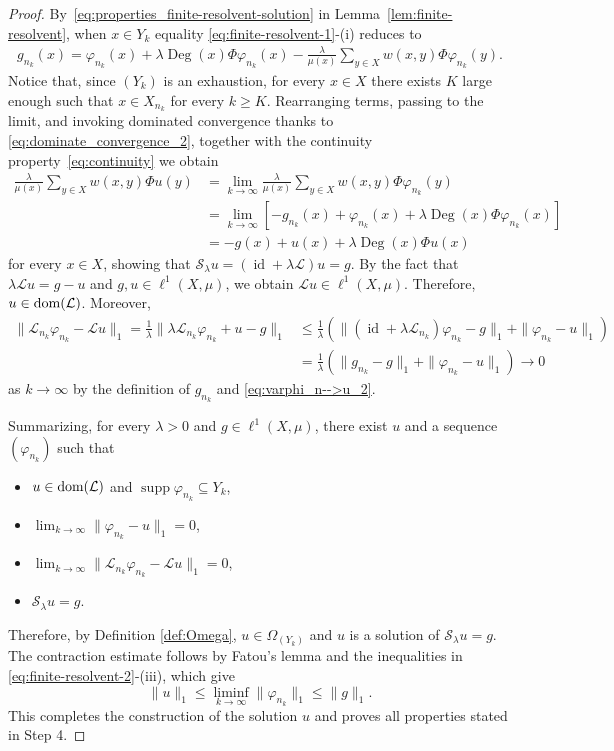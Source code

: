 \documentclass[letterpaper]{article}
\theoremstyle{definition}
\theoremstyle{named}
\numberwithin{equation}{section}
\newcommand{\dom}{\textnormal{dom}} %
\newcommand{\Deg}{\operatorname{Deg}}
\newcommand{\id}{\operatorname{id}}
\newcommand{\Deltaphi}{\mathcal{L}}
\begin{document}
\begin{proof}
By~\eqref{eq:properties_finite-resolvent-solution} in Lemma~\ref{lem:finite-resolvent}, when $x\in Y_k$
equality \eqref{eq:finite-resolvent-1}-(i) reduces to
\begin{align*}
g_{n_k}(x) = \varphi_{n_k}(x)+\lambda\Deg(x)\Phi\varphi_{n_k}(x)  -\frac{\lambda}{\mu(x)}\sum_{y\in X}w(x,y)\Phi\varphi_{n_k}(y).
\end{align*}
Notice that, since $(Y_k)$ is an exhaustion, for every $x\in X$ there exists $K$ large enough such that $x\in X_{n_k}$ for every $k\geq K$.  Rearranging terms, passing to the limit, and invoking dominated convergence thanks to \eqref{eq:dominate_convergence_2}, together with the continuity property~\eqref{eq:continuity} we obtain
\begin{align}
\frac{\lambda}{\mu(x)} \sum_{y \in X} w(x,y) \Phi u (y) & = \lim_{k\to\infty} \frac{\lambda}{\mu(x)} \sum_{y \in X} w(x,y) \Phi \varphi_{n_k} (y) \label{eq:extraHP}\\
&= 
\lim_{k\to\infty} [- g_{n_k}(x) + \varphi_{n_k}(x)+\lambda \Deg(x) \Phi \varphi_{n_k}(x)] \nonumber\\
&= - g(x) + u(x) +\lambda \Deg(x) \Phi u(x)  \nonumber
\end{align}
for every  $x\in X$,
showing that
$\mathcal{S}_\lambda u = (\id + \lambda \Deltaphi) u  = g$. By the fact that $\lambda \Deltaphi u = g - u$ and $g, u \in \ell^1(X, \mu)$, we obtain $\Deltaphi u \in \ell^1(X, \mu)$. Therefore, $u\in \dom(\Deltaphi)$. Moreover,
\begin{align}
\|\mathcal{L}_{n_k} \varphi_{n_k} - \Deltaphi u\|_1 = \frac{1}{\lambda} \| \lambda\mathcal{L}_{n_k} \varphi_{n_k} + u - g\|_1 
&\leq \frac{1}{\lambda} \left( \|(\operatorname{id} + \lambda \mathcal{L}_{n_k}) \varphi_{n_k} - g\|_1 + \| \varphi_{n_k} - u\|_1 \right) \nonumber\\
&=\frac{1}{\lambda} \left( \|g_{n_k} - g\|_1 + \| \varphi_{n_k} - u\|_1 \right)  \to 0
\end{align}
as $k \to \infty$
by the definition of $g_{n_k}$ and \eqref{eq:varphi_n-->u_2}.

Summarizing, for every $\lambda >0$ and $g\in \ell^1(X,\mu)$, there exist $u$ and a sequence $(\varphi_{n_k})$ such that
\begin{itemize}
    \item $u\in \dom(\Deltaphi)$ and $\operatorname{supp}\varphi_{n_k} \subseteq Y_k$,
    \item $\lim_{k\to\infty} \| \varphi_{n_k} - u\|_1 = 0$,
    \item $\lim_{k\to\infty}    \| \mathcal{L}_{n_k} \varphi_{n_k} - \Deltaphi u\|_1 = 0$,
    \item $\mathcal{S}_\lambda u = g$.
\end{itemize}
Therefore, by Definition \ref{def:Omega}, $u \in \Omega_{(Y_k)}$ and $u$ 
is a solution of $\mathcal{S}_\lambda u = g$. 
The contraction estimate follows by Fatou's lemma 
and the  inequalities in  \eqref{eq:finite-resolvent-2}-(iii), which give
$$
\|u\|_1 \leq  \liminf_{k \to \infty} \|\varphi_{n_k}\|_1 \leq \|g\|_1.
$$
{ This completes the construction of the solution $u$
and proves all properties stated in Step 4.}


\end{proof}
\end{document}

